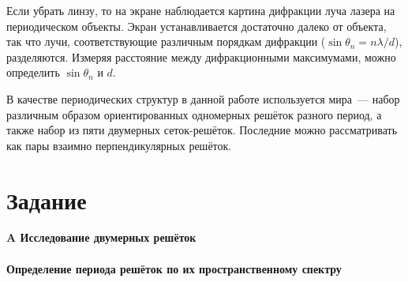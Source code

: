 \documentclass[a4paper,12pt]{extarticle}
\begin{document}
Если убрать линзу, то на экране наблюдается картина дифракции луча лазера на периодическом объекты. Экран устанавливается достаточно далеко от объекта, так что лучи, соответствующие различным порядкам дифракции ($\sin \theta_n = n\lambda/d$), разделяются. Измеряя расстояние между дифракционными максимумами, можно определить $\sin \theta_n$ и $d$.

В качестве периодических структур в данной работе используется мира~--- набор различным образом ориентированных одномерных решёток разного период, а также набор из пяти двумерных сеток-решёток. Последние можно рассматривать как пары взаимно перпендикулярных решёток.

\section*{Задание}
{\large \textbf{A Исследование двумерных решёток}}\\ \\ 
\textbf{\uppercase\expandafter{} Определение периода решёток по их пространственному спектру}\\ 
\end{document}
